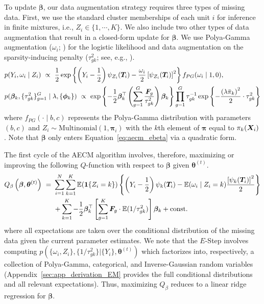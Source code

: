 To update $\bm{\beta}$, our data augmentation strategy requires three
types of missing data.  First, we use the standard cluster memberships of each
unit $i$ for inference in finite mixtures, i.e.,
$Z_i \in \{1, \cdots, K\}$.  We also include two other types of data
augmentation that result in a closed-form update for $\bm{\beta}$.  We
use Polya-Gamma augmentation ($\omega_i$;
\citealt{polson2013polyagamma}) for the logistic likelihood and data
augmentation on the sparsity-inducing penalty ($\tau^2_{gk}$; see,
e.g.,
\citealt{figueiredo2003adaptive,polson2011svm,ratkovic2017sparse,goplerud2021sparsity}).
\begin{subequations}
\label{eq:aecm_ebeta}
\begin{align}
&p(Y_i, \omega_{i} \mid Z_i) \ \propto \ \frac{1}{2}\exp\left\{\left(Y_i - \frac{1}{2}\right) \psi_{Z_i}(\bT_i) - \frac{\omega_{i}}{2} \left[\psi_{Z_i}(\bT_i)\right]^2\right\} f_{PG}(\omega_{i} \mid 1, 0),\label{eq:augmented1} \\
&p(\bm{\beta}_k, \{\tau^2_{gk}\}_{g=1}^G \mid \lambda,
\{\bm{\phi}_k\}) \ \propto \
\exp\left\{-\frac{1}{2}\bm{\beta}_k^\top\left(\sum_{g=1}^G
\frac{\bm{F}_{g}}{\tau^2_{gk}}\right)
\bm{\beta}_k\right\} \prod_{g=1}^G\tau_{gk}^{-1}
\exp\left\{-\frac{\left(\lambda \bar{\pi}_k\right)^2}{2} \cdot \tau^2_{gk}\right\} \label{eq:augmented2}
\end{align}
\end{subequations}
where $f_{PG}(\cdot \mid b, c)$ represents the Polya-Gamma
distribution with parameters $(b,c)$ and
$Z_i \sim \mathrm{Multinomial}\left(1, \bm{\pi}_i\right)$ with the
$k$th element of $\bm{\pi}$ equal to $\pi_k(\bm{X}_i)$. Note that
$\bm{\beta}$ only enters Equation~\eqref{eq:aecm_ebeta} via a
quadratic form.

The first cycle of the AECM algorithm involves, therefore, maximizing
or improving the following $Q$-function with respect to $\bm{\beta}$
given $\bm{\theta}^{(t)}$.
\begin{align}
\label{eq:aecm_qbeta}
Q_\beta\left(\bm{\beta}, \bm{\theta}^{(t)}\right)\ = \ &\sum_{i=1}^N \sum_{k=1}^K \mathbb{E}(\mathbf{1}\{Z_i = k\})\left\{\left(Y_i -
\frac{1}{2}\right) \psi_{k}(\bm{T}_i) - \mathbb{E}(\omega_i \mid Z_i = k)
\frac{\left[\psi_k(\bm{T}_i)\right]^2}{2}\right\}  \nonumber \\
                                                  & + \sum_{k=1}^K -\frac{1}{2}
\bm{\beta}_k^\top \left[\sum_{g=1}^K \bm{F}_g \cdot
\mathbb{E}(1/\tau^2_{gk})\right] \bm{\beta}_k + \text{const.}
\end{align}
where all expectations are taken over the conditional distribution of
the missing data given the current parameter estimates.  We note that
the $E$-Step involves computing
$p(\{\omega_i, Z_i\}, \{1/\tau^2_{gk}\} | \{Y_i\}, \bm{\theta}^{(t)})$
which factorizes into, respectively, a collection of Polya-Gamma,
categorical, and Inverse-Gaussian random variables
(Appendix~\ref{sec:app_derivation_EM} provides the full conditional
distributions and all relevant expectations).  Thus, maximizing
$Q_\beta$ reduces to a linear ridge regression for $\bm{\beta}$.

